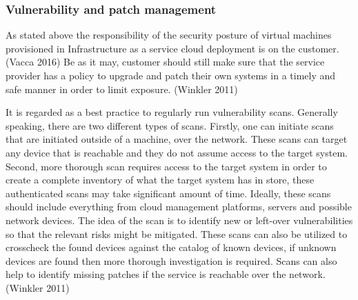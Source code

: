\documentclass{article}
\begin{document}
\subsubsection{Vulnerability and patch management}
As stated above the responsibility of the security posture of virtual machines provisioned in Infrastructure as a service cloud deployment is on the customer. (Vacca 2016) Be as it may, customer should still make sure that the service provider has a policy to upgrade and patch their own systems in a timely and safe manner in order to limit exposure. (Winkler 2011)
\par
It is regarded as a best practice to regularly run vulnerability scans. Generally speaking, there are two different types of scans. Firstly, one can initiate scans that are initiated outside of a machine, over the network. These scans can target any device that is reachable and they do not assume access to the target system. Second, more thorough scan requires access to the target system in order to create a complete inventory of what the target system has in store, these authenticated scans may take significant amount of time. Ideally, these scans should include everything from cloud management platforms, servers and possible network devices. The idea of the scan is to identify new or left-over vulnerabilities so that the relevant risks might be mitigated. These scans can also be utilized to crosscheck the found devices against the catalog of known devices, if unknown devices are found then more thorough investigation is required. Scans can also help to identify missing patches if the service is reachable over the network. (Winkler 2011)
\end{document}
